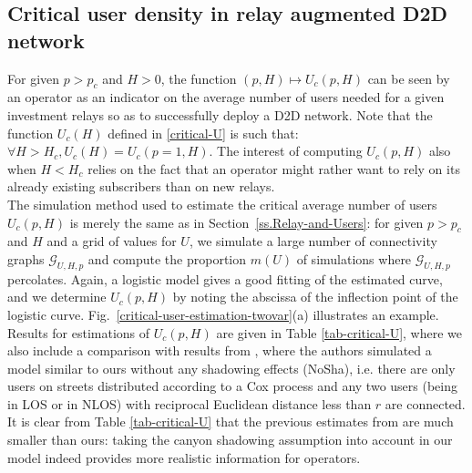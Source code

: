 \documentclass[conference]{IEEEtran}
\begin{document}
\subsection{Critical user density  in relay augmented D2D network}
For given $p>p_c$ and $H >0$, the function $(p,H) \mapsto U_c(p,H)$ can be seen by an operator as an indicator on the average number of users needed for a given investment relays so as to successfully deploy a D2D network. Note that the function $U_c(H)$ defined in \eqref{critical-U} is such that: $\forall H>H_c, U_c(H) = U_c(p=1,H)$. The interest of computing $U_c(p,H)$ also when $H<H_c$ relies on the fact that an operator might rather want to rely on its already existing subscribers than on new relays.\\
\indent The simulation method used to estimate the critical average number of users $U_{c}(p,H)$ is merely the same as in Section~\ref{ss.Relay-and-Users}: for given $p>p_c$ and $H$ and a grid of values for $U$, we simulate a large number of connectivity graphs $\mathcal{G}_{U,H,p}$ and compute the proportion $m(U)$ of simulations where $\mathcal{G}_{U,H,p}$ percolates. Again, a logistic model gives a good fitting of the estimated curve, and we determine $U_{c}(p,H)$ by noting the abscissa of the inflection point of the logistic curve. Fig.~\ref{critical-user-estimation-twovar}(a) illustrates an example. Results for estimations of $U_c(p,H)$ are given in Table \ref{tab-critical-U}, where we also include a comparison with results from \cite{cali2018percolation}, where the authors simulated a model similar to ours without any shadowing effects (NoSha), i.e. there are only users on streets distributed according to a Cox process and any two users (being in LOS or in NLOS) with reciprocal Euclidean distance less than $r$ are connected. It is clear from Table \ref{tab-critical-U} that the previous estimates from \cite{cali2018percolation} are much smaller than ours: taking the canyon shadowing assumption into account in our model indeed provides more realistic information for operators.

\end{document}
